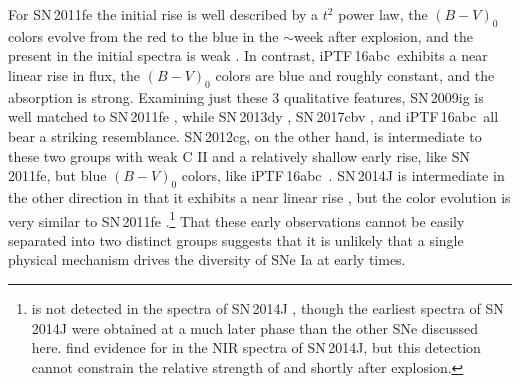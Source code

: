 \documentclass[twocolumn]{aastex61}
\newcommand{\abc}{iPTF\,16abc}
\begin{document}
For SN\,2011fe the initial rise is well described by a $t^2$ power law, the
$(B - V)_0$ colors evolve from the red to the blue in the $\sim$week after
explosion, and the  present in the initial spectra is weak
\citep{2011Natur.480..344N,2016ApJ...820...67Z,2012ApJ...752L..26P}. In
contrast, \abc\ exhibits a near linear rise in flux, the $(B - V)_0$ colors
are blue and roughly constant, and the  absorption is strong.
Examining just these 3 qualitative features, SN\,2009ig is well matched to
SN\,2011fe \citep{2012ApJ...744...38F}, while SN\,2013dy
\citep{2013ApJ...778L..15Z}, SN\,2017cbv \citep{2017ApJ...845L..11H}, and
\abc\ all bear a striking resemblance. SN\,2012cg, on the other hand, is
intermediate to these two groups with weak C II and a relatively shallow early
rise, like SN\,2011fe, but blue $(B - V)_0$ colors, like \abc\
\citep{2012ApJ...756L...7S,2016ApJ...820...92M}. SN\,2014J is intermediate in
the other direction in that it exhibits a near linear rise
\citep{2014ApJ...783L..24Z,2015ApJ...799..106G}, but the color evolution is
very similar to SN\,2011fe \citep{2014ApJ...788L..21A}.\footnote{\ion{C}{2} is
not detected in the spectra of SN\,2014J
\citep{2014ApJ...784L..12G,2014ApJ...783L..24Z}, though the earliest spectra
of SN\,2014J were obtained at a much later phase than the other SNe discussed
here. \citet{2015ApJ...798...39M} find evidence for \ion{C}{1} in the NIR
spectra of SN\,2014J, but this detection cannot constrain the relative
strength of \ion{C}{2} and \ion{Si}{2} shortly after explosion.} That these
early observations cannot be easily separated into two distinct groups
suggests that it is unlikely that a single physical mechanism drives the
diversity of SNe Ia at early times.
\end{document}
